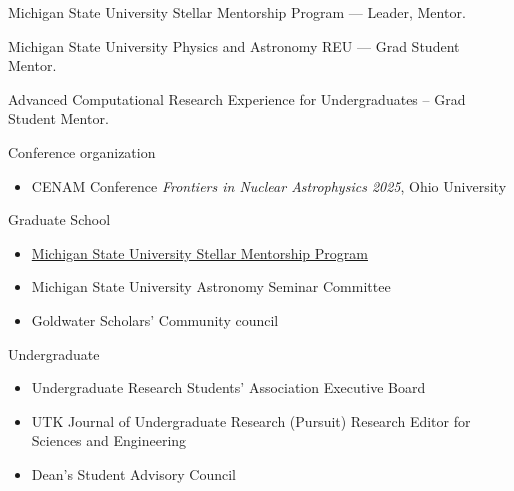 \documentclass[11pt]{vitae}
\begin{document}
\begin{genericlist}
\item Michigan State University Stellar Mentorship Program --- Leader, Mentor.
\item Michigan State University Physics and Astronomy REU --- Grad Student Mentor.
\item Advanced Computational Research Experience for Undergraduates -- Grad Student Mentor.
\end{genericlist}

\begin{genericlist}
\item Conference organization
  \begin{itemize}
    \item[] CENAM Conference \emph{Frontiers in Nuclear Astrophysics 2025}, Ohio University
  \end{itemize}
\item Graduate School
  \begin{itemize}
      \item[] \href{https://astro.natsci.msu.edu/personal-and-professional-support/stellar-mentorship-program.aspx}{Michigan State University Stellar Mentorship Program}
      \item Michigan State University Astronomy Seminar Committee
      \item Goldwater Scholars' Community council
  \end{itemize}
\item Undergraduate
  \begin{itemize}
    \item Undergraduate Research Students' Association Executive Board
    \item UTK Journal of Undergraduate Research (Pursuit) Research Editor for Sciences and Engineering
    \item Dean's Student Advisory Council
  \end{itemize}
\end{genericlist}
\end{document}
